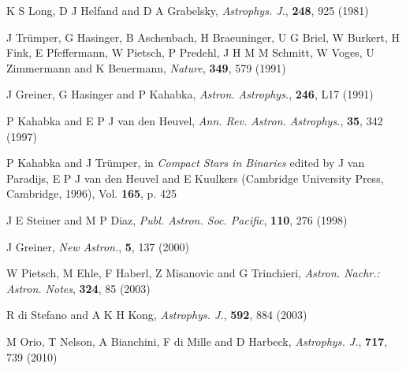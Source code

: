 %

\newcommand{\Nat}{Nature}
\newcommand{\AnA}{Astron. Astrophys.}
\newcommand{\AnASS}{Astron. Astrophys. Suppl. Series}
\newcommand{\ARAA}{Ann. Rev. Astron. Astrophys.}
\newcommand{\ApJ}{Astrophys. J.}
\newcommand{\PASP}{Publ. Astron. Soc. Pacific}
\newcommand{\NA}{New Astron.}
\newcommand{\ANAN}{Astron. Nachr.: Astron. Notes}
\newcommand{\MNRAS}{Mon. Not. R. Astron. Soc.}
\newcommand{\ASR}{Adv. Space Res.}
\newcommand{\RMP}{Rev. Mod. Phys.}
\newcommand{\Pram}{Pramana}
\newcommand{\SAM}{Stellar Atmos. Modeling}
\newcommand{\JCAM}{J. Comput. Appl. Math.}
\newcommand{\AJET}{ADBU J. Eng. Technol.}
\newcommand{\ARX}{arXiv preprint}

\begin{thebibliography}{100}
	K S Long, D J Helfand and D A Grabelsky, \textit{\ApJ}, \textbf{248}, 925 (1981)
	
	J Tr{\"u}mper, G Hasinger, B Aschenbach, H Braeuninger, U G Briel, W Burkert, H Fink, E Pfeffermann, W Pietsch, P Predehl, J H M M Schmitt, W Voges, U Zimmermann and K Beuermann, \textit{\Nat}, \textbf{349}, 579 (1991)
	
	J Greiner, G Hasinger and P Kahabka, \textit{\AnA}, \textbf{246}, L17 (1991)
	
	P Kahabka and E P J van den Heuvel, \textit{\ARAA}, \textbf{35}, 342 (1997)
	
	P Kahabka and J Tr{\"u}mper, in \textit{Compact Stars in Binaries} edited by J van Paradijs, E P J van den Heuvel and E Kuulkers (Cambridge University Press, Cambridge, 1996), Vol. \textbf{165}, p. 425

	J E Steiner and M P Diaz, \textit{\PASP}, \textbf{110}, 276 (1998)

	J Greiner, \textit{\NA}, \textbf{5}, 137 (2000)

	W Pietsch, M Ehle, F Haberl, Z Misanovic and G Trinchieri, \textit{\ANAN}, \textbf{324}, 85 (2003)

	R di Stefano and A K H Kong, \textit{\ApJ}, \textbf{592}, 884 (2003)

	M Orio, T Nelson, A Bianchini, F di Mille and D Harbeck, \textit{\ApJ}, \textbf{717}, 739 (2010)


\end{thebibliography}
